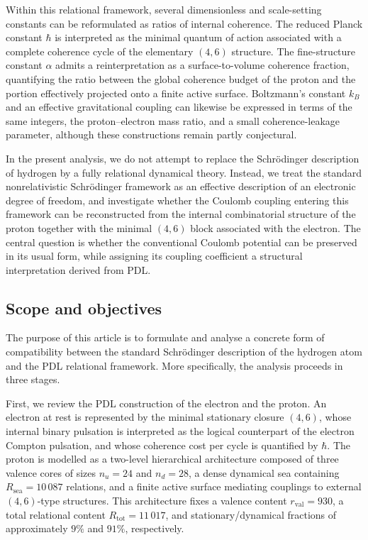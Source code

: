 \documentclass[12pt,a4paper]{article}
\begin{document}
Within this relational framework, several dimensionless and scale-setting constants can be reformulated as ratios of internal coherence. The reduced Planck constant \(\hbar\) is interpreted as the minimal quantum of action associated with a complete coherence cycle of the elementary \((4,6)\) structure. The fine-structure constant \(\alpha\) admits a reinterpretation as a surface-to-volume coherence fraction, quantifying the ratio between the global coherence budget of the proton and the portion effectively projected onto a finite active surface. Boltzmann’s constant \(k_B\) and an effective gravitational coupling can likewise be expressed in terms of the same integers, the proton–electron mass ratio, and a small coherence-leakage parameter, although these constructions remain partly conjectural.\cite{Laubscher2026PDL_English,Laubscher2026LDP_French}

In the present analysis, we do not attempt to replace the Schr\"odinger description of hydrogen by a fully relational dynamical theory. Instead, we treat the standard nonrelativistic Schr\"odinger framework as an effective description of an electronic degree of freedom, and investigate whether the Coulomb coupling entering this framework can be reconstructed from the internal combinatorial structure of the proton together with the minimal \((4,6)\) block associated with the electron. The central question is whether the conventional Coulomb potential can be preserved in its usual form, while assigning its coupling coefficient a structural interpretation derived from PDL.

\subsection{Scope and objectives}

The purpose of this article is to formulate and analyse a concrete form of compatibility between the standard Schr\"odinger description of the hydrogen atom and the PDL relational framework. More specifically, the analysis proceeds in three stages.

First, we review the PDL construction of the electron and the proton. An electron at rest is represented by the minimal stationary closure \((4,6)\), whose internal binary pulsation is interpreted as the logical counterpart of the electron Compton pulsation, and whose coherence cost per cycle is quantified by \(\hbar\). The proton is modelled as a two-level hierarchical architecture composed of three valence cores of sizes \(n_u = 24\) and \(n_d = 28\), a dense dynamical sea containing \(R_{\text{sea}} = 10\,087\) relations, and a finite active surface mediating couplings to external \((4,6)\)-type structures. This architecture fixes a valence content \(r_{\text{val}} = 930\), a total relational content \(R_{\text{tot}} = 11\,017\), and stationary/dynamical fractions of approximately \(9\%\) and \(91\%\), respectively.\cite{Laubscher2026PDL_English,Laubscher2026LDP_French}
\end{document}

